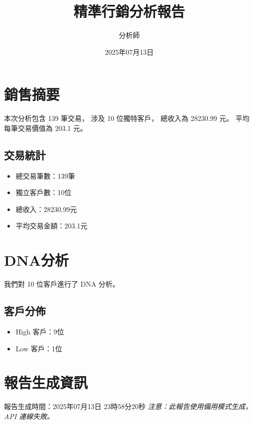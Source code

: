 \documentclass{article}
\title{精準行銷分析報告}
\author{分析師}
\date{2025年07月13日}
\begin{document}
\maketitle

\section{銷售摘要}
本次分析包含 139 筆交易，
涉及 10 位獨特客戶，
總收入為 28230.99 元。
平均每筆交易價值為 203.1 元。

\subsection{交易統計}
\begin{itemize}
\item 總交易筆數：139筆
\item 獨立客戶數：10位
\item 總收入：28230.99元
\item 平均交易金額：203.1元
\end{itemize}

\section{DNA分析}
我們對 10 位客戶進行了 DNA 分析。

\subsection{客戶分佈}
\begin{itemize}
\item High 客戶：9位
\item Low 客戶：1位
\end{itemize}

\section{報告生成資訊}
報告生成時間：2025年07月13日 23時58分20秒
\textit{注意：此報告使用備用模式生成，API 連線失敗。}
\end{document}
